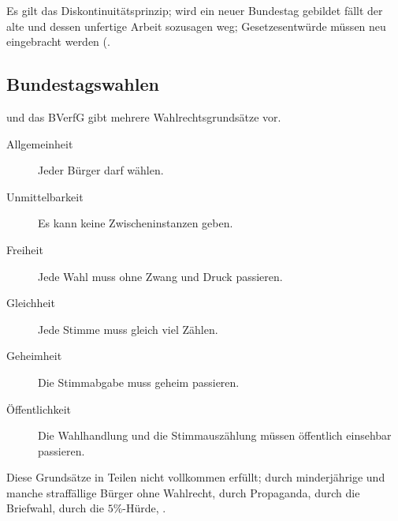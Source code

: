 \documentclass{article}
\begin{document}
Es gilt das Diskontinuitätsprinzip; wird ein neuer Bundestag gebildet fällt der alte und dessen unfertige Arbeit sozusagen weg; \zb Gesetzesentwürde müssen neu eingebracht werden (.

\subsection{Bundestagswahlen}
 \GG und das BVerfG gibt mehrere Wahlrechtsgrundsätze vor.
\begin{description}
 \item[Allgemeinheit] Jeder Bürger darf wählen.
 \item[Unmittelbarkeit] Es kann keine Zwischeninstanzen geben.
 \item[Freiheit] Jede Wahl muss ohne Zwang und Druck passieren.
 \item[Gleichheit] Jede Stimme muss gleich viel Zählen.
 \item[Geheimheit] Die Stimmabgabe muss geheim passieren.
 \item[Öffentlichkeit] Die Wahlhandlung und die Stimmauszählung müssen öffentlich einsehbar passieren.
\end{description}
Diese Grundsätze in Teilen nicht vollkommen erfüllt; durch minderjährige und manche straffällige Bürger ohne Wahlrecht, durch Propaganda, durch die Briefwahl, durch die $5\%$-Hürde, \usw.
\end{document}
